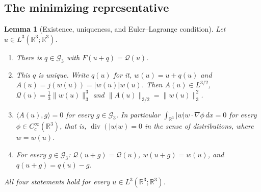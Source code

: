 \documentclass[11pt]{article}
\newtheorem{lemma}[theorem]{Lemma}
\theoremstyle{definition}
\theoremstyle{plain}
\newcommand{\R}{\mathbb R}
\newcommand{\norm}[1]{\lVert #1\rVert}
\begin{document}
\subsection{The minimizing representative}

\begin{lemma}[Existence, uniqueness, and Euler--Lagrange condition]
\label{lem:quotient-minimizer}
Let $u\in L^3(\R^3;\R^3)$.
\begin{enumerate}
\item[(a)] There is $q\in\mathcal G_3$ with $F(u+q)=\mathcal Q(u)$.
\item[(b)] This $q$ is unique.  Write $q(u)$ for it, $w(u)=u+q(u)$ and
 $A(u)=j(w(u))=|w(u)|w(u)$.  Then $A(u)\in L^{3/2}$,
 $\mathcal Q(u)=\frac13\norm{w(u)}_3^3$ and $\norm{A(u)}_{3/2}=\norm{w(u)}_3^2$.
\item[(c)] $\langle A(u),g\rangle=0$ for every $g\in\mathcal G_3$.  In
 particular $\int_{\R^3}|w|w\cdot\nabla\phi\,dx=0$ for every
 $\phi\in C_c^\infty(\R^3)$, that is, $\operatorname{div}(|w|w)=0$ in the
 sense of distributions, where $w=w(u)$.
\item[(d)] For every $g\in\mathcal G_3$: $\mathcal Q(u+g)=\mathcal Q(u)$,
 $w(u+g)=w(u)$, and $q(u+g)=q(u)-g$.
\end{enumerate}
All four statements hold for every $u\in L^3(\R^3;\R^3)$.
\end{lemma}
\end{document}
